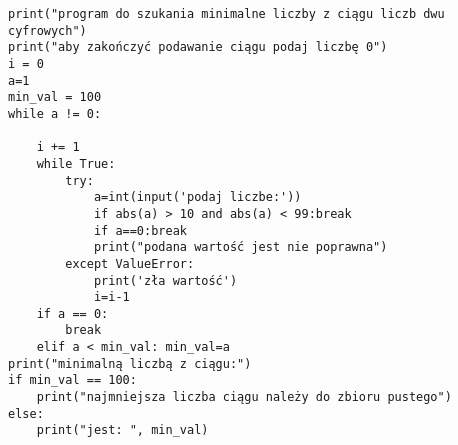 \begin{verbatim}
print("program do szukania minimalne liczby z ciągu liczb dwu cyfrowych")
print("aby zakończyć podawanie ciągu podaj liczbę 0")
i = 0
a=1
min_val = 100
while a != 0:
    
    i += 1
    while True:
        try:
            a=int(input('podaj liczbe:'))
            if abs(a) > 10 and abs(a) < 99:break
            if a==0:break   
            print("podana wartość jest nie poprawna")
        except ValueError:
            print('zła wartość')
            i=i-1
    if a == 0:
        break
    elif a < min_val: min_val=a
print("minimalną liczbą z ciągu:")
if min_val == 100:
    print("najmniejsza liczba ciągu należy do zbioru pustego")
else:
    print("jest: ", min_val)
\end{verbatim}